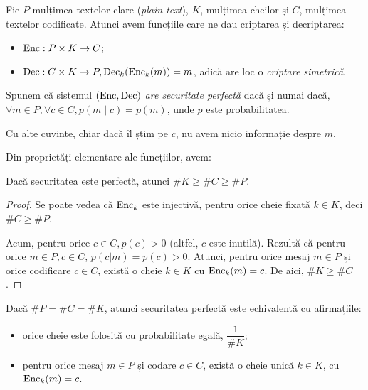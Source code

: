 Fie $ P $ mulțimea textelor clare (\emph{plain text}), $ K $,
mulțimea cheilor și $ C $, mulțimea textelor codificate.
Atunci avem funcțiile care ne dau criptarea și decriptarea:
\begin{itemize} 
\item $ \mathrm{Enc} : P \times K \to C $;
\item $ \mathrm{Dec} : C \times K \to P, \mathrm{Dec}_k(\mathrm{Enc}_k(m)) = m $,
  adică are loc o \emph{criptare simetrică}.
\end{itemize}

\begin{definition}\label{def:sec-perf} 
  Spunem că sistemul $ (\mathrm{Enc}, \mathrm{Dec}) $ \emph{are securitate perfectă}
  dacă și numai dacă, $ \forall m \in P, \forall c \in C, p(m \mid c) = p(m) $,
  unde $ p $ este probabilitatea.

  Cu alte cuvinte, chiar dacă îl știm pe $ c $, nu avem nicio informație despre $ m $.
\end{definition}

Din proprietăți elementare ale funcțiilor, avem:
\begin{lemma}\label{le:sec-perf}
  Dacă securitatea este perfectă, atunci $ \# K \geq \# C \geq \# P $.
\end{lemma}

\begin{proof}
  Se poate vedea că $ \mathrm{Enc}_k $ este injectivă, pentru orice cheie fixată
  $ k \in K $, deci $ \# C \geq \# P $.

  Acum, pentru orice $ c \in C, p(c) > 0 $ (altfel, $ c $ este inutilă).
  Rezultă că pentru orice $ m \in P, c \in C $, $ p(c | m) = p(c) > 0 $\footnotemark.
  Atunci, pentru orice mesaj $ m \in P $ și orice codificare $ c \in C $, există
  o cheie $ k \in K $ cu $ \mathrm{Enc}_k(m) = c $. De aici, $ \# K \geq \# C $.
\end{proof}


\begin{theorem}[Shannon]\label{thm:shannon}
  Dacă $ \# P = \# C = \# K $, atunci securitatea perfectă este echivalentă
  cu afirmațiile:
  \begin{itemize}
  \item orice cheie este folosită cu probabilitate egală, $ \dfrac{1}{\# K} $;
  \item pentru orice mesaj $ m \in P $ și codare $ c \in C $, există o cheie
    unică $ k \in K $, cu $ \mathrm{Enc}_k(m) = c $.
  \end{itemize}
\end{theorem}

